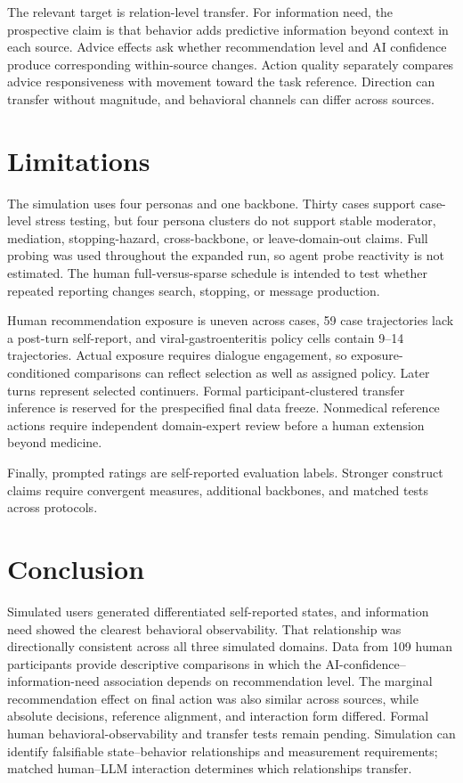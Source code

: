 \documentclass{article}
\begin{document}
The relevant target is relation-level transfer. For information need, the prospective claim is that behavior adds predictive information beyond context in each source. Advice effects ask whether recommendation level and AI confidence produce corresponding within-source changes. Action quality separately compares advice responsiveness with movement toward the task reference. Direction can transfer without magnitude, and behavioral channels can differ across sources.

\section{Limitations}

The simulation uses four personas and one backbone. Thirty cases support case-level stress testing, but four persona clusters do not support stable moderator, mediation, stopping-hazard, cross-backbone, or leave-domain-out claims. Full probing was used throughout the expanded run, so agent probe reactivity is not estimated. The human full-versus-sparse schedule is intended to test whether repeated reporting changes search, stopping, or message production.

Human recommendation exposure is uneven across cases, 59 case trajectories lack a post-turn self-report, and viral-gastroenteritis policy cells contain 9--14 trajectories. Actual exposure requires dialogue engagement, so exposure-conditioned comparisons can reflect selection as well as assigned policy. Later turns represent selected continuers. Formal participant-clustered transfer inference is reserved for the prespecified final data freeze. Nonmedical reference actions require independent domain-expert review before a human extension beyond medicine.

Finally, prompted ratings are self-reported evaluation labels. Stronger construct claims require convergent measures, additional backbones, and matched tests across protocols.

\section{Conclusion}

Simulated users generated differentiated self-reported states, and information need showed the clearest behavioral observability. That relationship was directionally consistent across all three simulated domains. Data from 109 human participants provide descriptive comparisons in which the AI-confidence--information-need association depends on recommendation level. The marginal recommendation effect on final action was also similar across sources, while absolute decisions, reference alignment, and interaction form differed. Formal human behavioral-observability and transfer tests remain pending. Simulation can identify falsifiable state--behavior relationships and measurement requirements; matched human--LLM interaction determines which relationships transfer.
\end{document}
